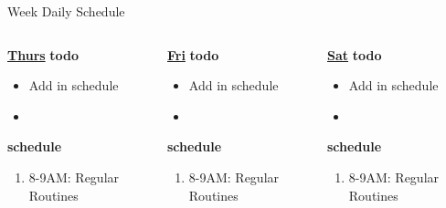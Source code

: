 \begin{frame}
\begin{columns}
\begin{column}{0.5\linewidth}
\begin{block}{Week Daily Schedule}
\begin{columns}
          \begin{column}{0.14\textwidth}{\small \underline{\bf Thurs}}
            {\small {\bf todo}} \\ 
            \begin{itemize}
              \tiny \item \tiny Add in schedule
            \item \tiny 
            \end{itemize} 
                {\small {\bf schedule}} \\
                \begin{enumerate} 
                  \tiny \item \tiny 8-9AM: Regular Routines 
                \end{enumerate}
          \end{column} 
          
          \begin{column}{0.14\textwidth}{\small \underline{\bf Fri}}
            {\small {\bf todo}} \\ 
            \begin{itemize}
              \tiny \item \tiny Add in schedule
            \item \tiny 
            \end{itemize} 
                {\small {\bf schedule}} \\
                \begin{enumerate} 
                  \tiny \item \tiny 8-9AM: Regular Routines 
                \end{enumerate}
          \end{column}

          \begin{column}{0.15\textwidth}{\small \underline{\bf Sat}}
            { \small {\bf todo}} \\ 
            \begin{itemize}
              \tiny \item \tiny Add in schedule
            \item \tiny 
            \end{itemize} 
                {\small {\bf schedule}} \\
                \begin{enumerate} 
                  \tiny \item \tiny 8-9AM: Regular Routines 
                \end{enumerate}
          \end{column}
          

\end{columns}
\end{block}
\end{column}
\end{columns}
\end{frame}
